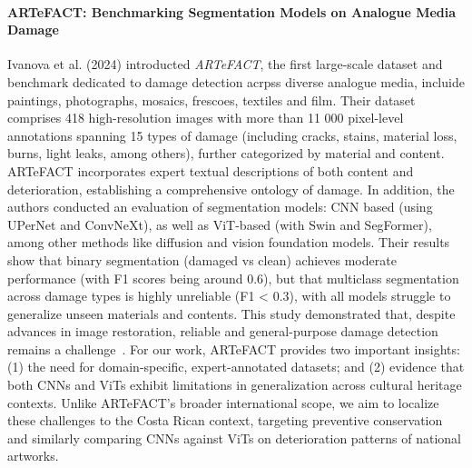 \documentclass[conference]{IEEEtran}
\begin{document}
\medskip
\paragraph*{ARTeFACT: Benchmarking Segmentation Models on Analogue Media Damage}
Ivanova et al. (2024) introducted \textit{ARTeFACT}, the first large-scale dataset and benchmark dedicated to damage detection acrpss diverse analogue media, incluide paintings, photographs, mosaics, frescoes, textiles and film. Their dataset comprises 418 high-resolution images with more than 11 000 pixel-level annotations spanning 15 types of damage (including cracks, stains, material loss, burns, light leaks, among others), further categorized by material and content. ARTeFACT incorporates expert textual descriptions of both content and deterioration, establishing a comprehensive ontology of damage. In addition, the authors conducted an evaluation of segmentation models: CNN based (using UPerNet and ConvNeXt), as well as ViT-based (with Swin and SegFormer), among other methods like diffusion and vision foundation models. Their results show that binary segmentation (damaged vs clean) achieves moderate performance (with F1 scores being around 0.6), but that multiclass segmentation across damage types is highly unreliable (F1 < 0.3), with all models struggle to generalize unseen materials and contents. This study demonstrated that, despite advances in image restoration, reliable and general-purpose damage detection remains a challenge~\cite{ivanova_artefact_2024}. For our work, ARTeFACT provides two important insights: (1) the need for domain-specific, expert-annotated datasets; and (2) evidence that both CNNs and ViTs exhibit limitations in generalization across cultural heritage contexts. Unlike ARTeFACT's broader international scope, we aim to localize these challenges to the Costa Rican context, targeting preventive conservation and similarly comparing CNNs against ViTs on deterioration patterns of national artworks.

\medskip
\end{document}
